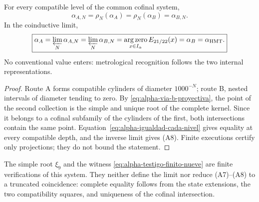 \begin{theorem}
\label{prop:alpha-dos-limites-historico-rev04}
For every compatible level of the common cofinal system,
\begingroup
\renewcommand{\theequation}{A7}
\begin{equation}
 \boxed{\alpha_{A,N}=\rho_N(\alpha_A)
 =\rho_N(\alpha_B)=\alpha_{B,N}.}
 \label{eq:alpha-dos-vias-cada-nivel-historico-rev04}
\end{equation}
\endgroup
In the coinductive limit,
\begingroup
\renewcommand{\theequation}{A8}
\begin{equation}
 \boxed{\alpha_A
 =\varprojlim_N\alpha_{A,N}
 =\varprojlim_N\alpha_{B,N}
 =\operatorname*{arg\,zero}_{x\in I_\alpha}E_{21/22}(x)
 =\alpha_B=\alpha_{\mathrm{HMT}}.}
 \label{eq:alpha-dos-vias-limite-coinductivo-historico-rev04}
\end{equation}
\endgroup
No conventional value enters: metrological recognition follows
the two internal representations.
\end{theorem}

\begin{proof}
Route A forms compatible cylinders of diameter \(1000^{-N}\); route B,
nested intervals of diameter tending to zero. By
\eqref{eq:alpha-via-b-proyectiva}, the point of the second collection is the
simple and unique root of the complete kernel. Since it belongs to a cofinal
subfamily of the cylinders of the first, both intersections contain the same point.
Equation~\eqref{eq:alpha-igualdad-cada-nivel} gives equality at every
compatible depth, and the inverse limit gives (A8). Finite executions
certify only projections; they do not bound the statement.
\end{proof}

The simple root \(\xi_9\) and the witness
\eqref{eq:alpha-testigo-finito-nueve} are finite verifications of this
system. They neither define the limit nor reduce (A7)--(A8) to a truncated
coincidence: complete equality follows from the state extensions, the two
compatibility squares, and uniqueness of the cofinal intersection.
